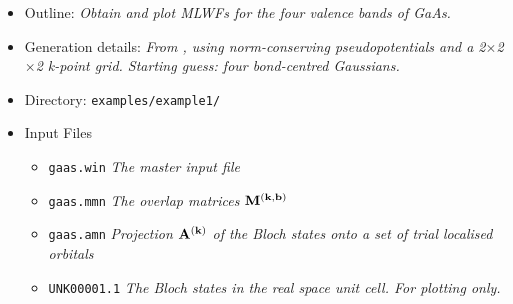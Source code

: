 \documentclass[a4paper,11pt,twoside]{article}
\begin{document}

\begin{itemize}
\item{Outline: \it{Obtain and plot MLWFs for the four valence
    bands of GaAs.}} 
\item{Generation details: \it{From \pwscf, using norm-conserving
    pseudopotentials and a 2$\times$2$\times$2 k-point grid. Starting
    guess: four bond-centred Gaussians.}}
\item{Directory: {\tt examples/example1/}}
\item{Input Files}
\begin{itemize}
\item{ {\tt gaas.win}  {\it The master input file}}
\item{ {\tt gaas.mmn}  {\it The overlap matrices $\mathbf{M}^{(\mathbf{k},\mathbf{b})}$}}
\item{ {\tt gaas.amn}  {\it Projection $\mathbf{A}^{(\mathbf{k})}$ of the Bloch states onto a set
    of trial localised orbitals}} 
\item{ {\tt UNK00001.1}  {\it The Bloch states in the real space unit
    cell. For plotting only.}} 
\end{itemize}
\end{itemize}
\end{document}
